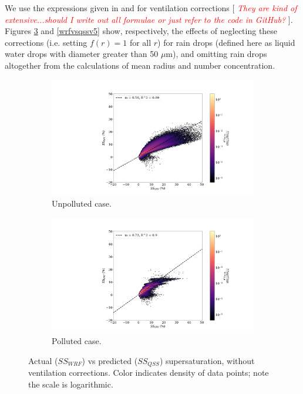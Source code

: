 \documentclass{article}
\newcommand{\klcomm}[1]{\textcolor{red}{\textit{#1}}}
\begin{document}
We use the expressions given in \cite{Pruppacher2010} and \cite{Rogers1989} for ventilation corrections [ \klcomm{They are kind of extensive...should I write out all formulae or just refer to the code in GitHub?} ]. Figures \ref{wrfvsqssv3} and \ref{wrfvsqssv5} show, respectively, the effects of neglecting these corrections (i.e. setting $f(r)=1$ for all $r$) for rain drops (defined here as liquid water drops with diameter greater than 50 $\mu$m), and omitting rain drops altogether from the calculations of mean radius and number concentration.

\begin{figure}[ht]
	\centering
	\begin{subfigure}{0.7\textwidth}
		\includegraphics[width=\textwidth]{revmywrf/v3_FINAL_heatmap_ss_qss_vs_ss_wrf_Unpolluted_figure.png}
		\caption{Unpolluted case.}
		\label{wrfvsqssunpollv3}
	\end{subfigure}
	\begin{subfigure}{0.7\textwidth}
		\includegraphics[width=\textwidth]{revmywrf/v3_FINAL_heatmap_ss_qss_vs_ss_wrf_Polluted_figure.png}
		\caption{Polluted case.}
		\label{wrfvsqsspollv3}
	\end{subfigure}
	\caption{Actual ($SS_{WRF}$) vs predicted ($SS_{QSS}$) supersaturation, without ventilation corrections. Color indicates density of data points; note the scale is logarithmic.}
	\label{wrfvsqssv3}
\end{figure}
\end{document}
